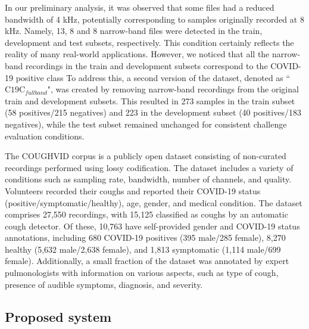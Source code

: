 In our preliminary analysis, it was observed that some files had a reduced bandwidth of 4 kHz, potentially corresponding to samples originally recorded at 8 kHz. Namely, 13, 8 and 8 narrow-band files were detected in the train, development and test subsets, respectively. This condition certainly reflects the reality of many real-world applications. However, we noticed that all the narrow-band recordings in the train and development subsets correspond to the COVID-19 positive class To address this, a second version of the dataset, denoted as ``$\text{C19C}_{fullband}$", was created by removing narrow-band recordings from the original train and development subsets. This resulted in 273 samples in the train subset (58 positives/215 negatives) and 223 in the development subset (40 positives/183 negatives), while the test subset remained unchanged for consistent challenge evaluation conditions.

The COUGHVID corpus \cite{Orlandic2020} is a publicly open dataset consisting of non-curated recordings performed using lossy codification. The dataset includes a variety of conditions such as sampling rate, bandwidth, number of channels, and quality. Volunteers recorded their coughs and reported their COVID-19 status (positive/symptomatic/healthy), age, gender, and medical condition.
The dataset comprises 27,550 recordings, with 15,125 classified as coughs by an automatic cough detector. Of these, 10,763 have self-provided gender and COVID-19 status annotations, including 680 COVID-19 positives (395 male/285 female), 8,270 healthy (5,632 male/2,638 female), and 1,813 symptomatic (1,114 male/699 female). Additionally, a small fraction of the dataset was annotated by expert pulmonologists with information on various aspects, such as type of cough, presence of audible symptoms, diagnosis, and severity.

\subsection{Proposed system}

